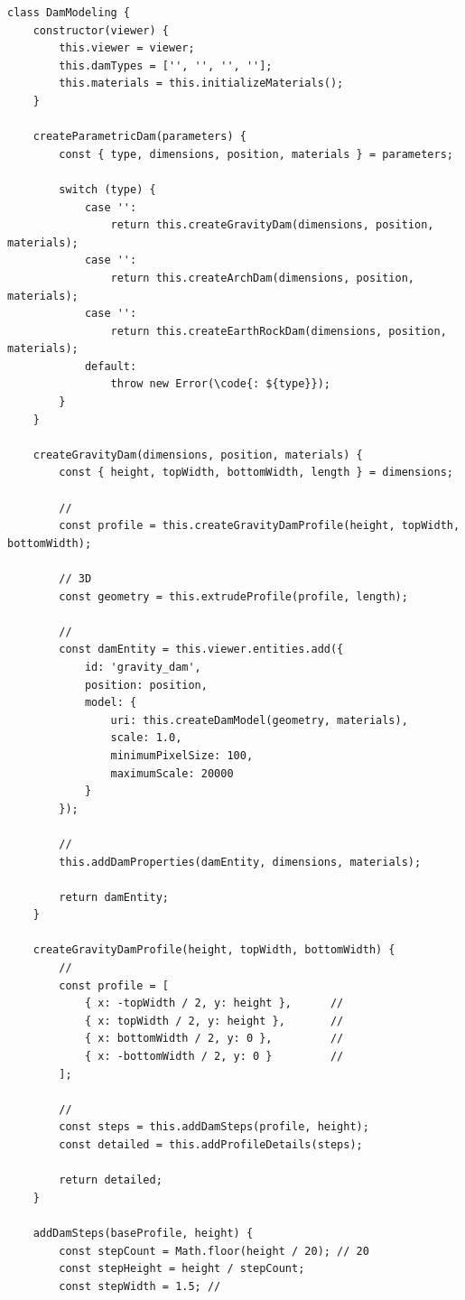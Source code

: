 \begin{lstlisting}[style=javascript]
class DamModeling {
    constructor(viewer) {
        this.viewer = viewer;
        this.damTypes = ['', '', '', ''];
        this.materials = this.initializeMaterials();
    }
    
    createParametricDam(parameters) {
        const { type, dimensions, position, materials } = parameters;
        
        switch (type) {
            case '':
                return this.createGravityDam(dimensions, position, materials);
            case '':
                return this.createArchDam(dimensions, position, materials);
            case '':
                return this.createEarthRockDam(dimensions, position, materials);
            default:
                throw new Error(\code{: ${type}});
        }
    }
    
    createGravityDam(dimensions, position, materials) {
        const { height, topWidth, bottomWidth, length } = dimensions;
        
        // 
        const profile = this.createGravityDamProfile(height, topWidth, bottomWidth);
        
        // 3D
        const geometry = this.extrudeProfile(profile, length);
        
        // 
        const damEntity = this.viewer.entities.add({
            id: 'gravity_dam',
            position: position,
            model: {
                uri: this.createDamModel(geometry, materials),
                scale: 1.0,
                minimumPixelSize: 100,
                maximumScale: 20000
            }
        });
        
        // 
        this.addDamProperties(damEntity, dimensions, materials);
        
        return damEntity;
    }
    
    createGravityDamProfile(height, topWidth, bottomWidth) {
        // 
        const profile = [
            { x: -topWidth / 2, y: height },      // 
            { x: topWidth / 2, y: height },       //   
            { x: bottomWidth / 2, y: 0 },         // 
            { x: -bottomWidth / 2, y: 0 }         // 
        ];
        
        // 
        const steps = this.addDamSteps(profile, height);
        const detailed = this.addProfileDetails(steps);
        
        return detailed;
    }
    
    addDamSteps(baseProfile, height) {
        const stepCount = Math.floor(height / 20); // 20
        const stepHeight = height / stepCount;
        const stepWidth = 1.5; // 
        

\end{lstlisting}
